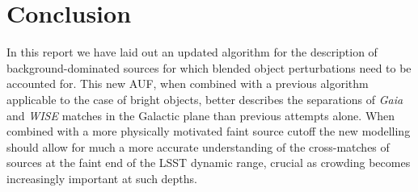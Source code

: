\documentclass[fleqn,usenatbib]{mnras}
\begin{document}
\section{Conclusion}
In this report we have laid out an updated algorithm for the description of background-dominated sources for which blended object perturbations need to be accounted for. This new AUF, when combined with a previous algorithm applicable to the case of bright objects, better describes the separations of \textit{Gaia} and \textit{WISE} matches in the Galactic plane than previous attempts alone. When combined with a more physically motivated faint source cutoff the new modelling should allow for much a more accurate understanding of the cross-matches of sources at the faint end of the LSST dynamic range, crucial as crowding becomes increasingly important at such depths.







\bsp	%
\label{lastpage}
\end{document}
